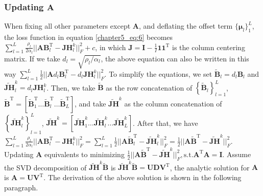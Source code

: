 \subsubsection*{Updating $\mathbf{A}$}
When fixing all other parameters except $\mathbf{A}$, and deflating the offset term $\{ \bm{\mu}_l \}_{1}^{L}$, the loss function in equation \ref{chapter5_eq:6} becomes $\sum_{l=1}^{L} \frac{\rho_l}{2\alpha_l} ||\mathbf{AB}_l^{\text{T}} - \mathbf{JH}_{l}^{k}||_F^2 + c$, in which $\mathbf{J} = \mathbf{I} - \frac{1}{I} \mathbf{1} \mathbf{1}^{\text{T}}$ is the column centering matrix. If we take $d_l = \sqrt{\rho_l /\alpha_l}$, the above equation can also be written in this way $\sum_{l=1}^{L} \frac{1}{2} ||\mathbf{A}d_l\mathbf{B}_l^{\text{T}} - d_l\mathbf{JH}_{l}^{k}||_F^2$. To simplify the equations, we set $\widetilde{\mathbf{B}}_l = d_l \mathbf{B}_l$ and $\widetilde{\mathbf{JH}}_l^k = d_l \mathbf{JH}_{l}^{k}$. Then, we take $\widetilde{\mathbf{B}}$ as the row concatenation of $\left\{ \widetilde{\mathbf{B}}_l \right\}_{l=1}^{L}$, $\widetilde{\mathbf{B}}^{\text{T}} = [\widetilde{\mathbf{B}}_1^{\text{T}}  \ldots \widetilde{\mathbf{B}}_l^{\text{T}} \ldots \widetilde{\mathbf{B}}_L^{\text{T}}]$, and take $\widetilde{\mathbf{JH}}^k$ as the column concatenation of $\left\{\widetilde{\mathbf{JH}}_l^k \right\}_{l=1}^{L}$, $\widetilde{\mathbf{JH}}^k = [\widetilde{\mathbf{JH}}_1^k \ldots \widetilde{\mathbf{JH}}_l^k \ldots \widetilde{\mathbf{JH}}_L^k]$. After that, we have $\sum_{l=1}^{L} \frac{\rho_l}{2\alpha_l} ||\mathbf{AB}_l^{\text{T}} - \mathbf{JH}_{l}^{k}||_F^2 = \sum_{l=1}^{L} \frac{1}{2} ||\mathbf{A}\widetilde{\mathbf{B}}_l^{\text{T}} - \widetilde{\mathbf{JH}}_{l}^{k}||_F^2 = \frac{1}{2}||\mathbf{A}\widetilde{\mathbf{B}}^{\text{T}} - \widetilde{\mathbf{JH}}^{k}||_F^2$. Updating $\mathbf{A}$ equivalents to minimizing $\frac{1}{2}||\mathbf{A}\widetilde{\mathbf{B}}^{\text{T}} - \widetilde{\mathbf{JH}}^{k}||_F^2, \text{s.t.} \mathbf{A}^{\text{T}}\mathbf{A} = \mathbf{I}$. Assume the SVD decomposition of $\widetilde{\mathbf{JH}}^{k}\widetilde{\mathbf{B}}$ is $\widetilde{\mathbf{JH}}^{k}\widetilde{\mathbf{B}} = \mathbf{UDV}^{\text{T}}$, the analytic solution for $\mathbf{A}$ is $\mathbf{A} = \mathbf{UV}^{\text{T}}$. The derivation of the above solution is shown in the following paragraph.


